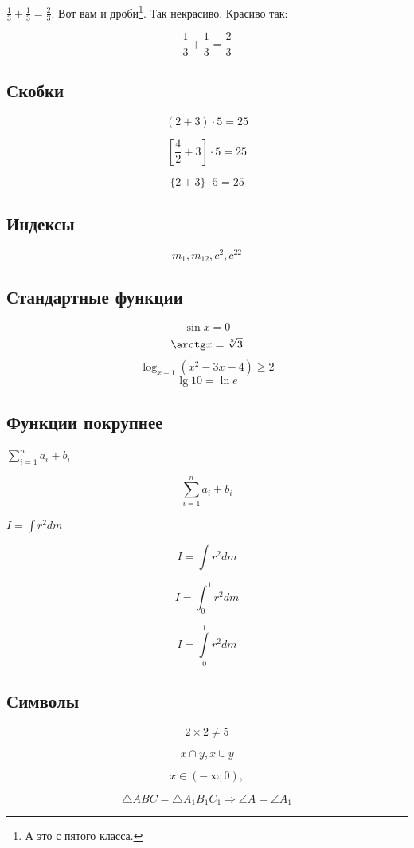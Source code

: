\documentclass[a4paper,12pt]{article} %
\begin{document}
$\frac{1}{3}+\frac{1}{3}=\frac{2}{3}$. Вот вам и дроби\footnote{А это с пятого класса.}. {\scriptsize Так некрасиво.} {\Large Красиво так}:

\[ \frac{1}{3}+\frac{1}{3}=\frac{2}{3} \]


\subsection{Скобки}

\[ (2+3)\cdot 5=25 \]

\[ \left[\frac{4}{2}+3\right]\cdot 5=25 \]

\[ \{2+3\}\cdot 5=25 \]

\subsection{Индексы}

\[ m_1, m_{12}, c^2, c^{22} \]

\subsection{Стандартные функции}

\[ \sin x=0 \]
\[ \arctg x=\sqrt[5]{3} \]
\[ \log_{x-1}{(x^2-3x-4)}\geqslant 2 \]
\[ \lg 10=\ln e \]

\subsection{Функции покрупнее}

$\sum_{i=1}^{n}a_i+b_i$

\[ \sum_{i=1}^{n}a_i+b_i \]

$I=\int r^2dm$

\[I=\int r^2dm \]

\[I=\int_{0}^{1} r^2dm \]

\[I=\int\limits_{0}^{1} r^2dm \]

\subsection{Символы}

\[2\times 2\neq 5 \]

\[x \cap y,  x \cup y\]

\[x\in (-\infty; 0),\]

\[ \triangle ABC = \triangle A_1B_1C_1 \Rightarrow \angle A= \angle A_1\]

\smiley


\newpage
\end{document}
